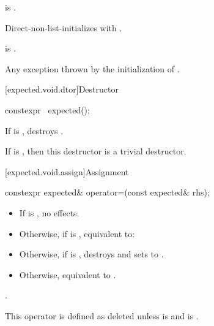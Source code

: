 \begin{itemdescr}
\pnum
\constraints
{} is .

\pnum
\effects
Direct-non-list-initializes 
with .

\pnum
\ensures
{} is .

\pnum
\throws
Any exception thrown by the initialization of .
\end{itemdescr}

[expected.void.dtor]{Destructor}

%
\begin{itemdecl}
constexpr ~expected();
\end{itemdecl}

\begin{itemdescr}
\pnum
\effects
If  is , destroys .

\pnum
\remarks
If  is ,
then this destructor is a trivial destructor.
\end{itemdescr}

[expected.void.assign]{Assignment}

%
\begin{itemdecl}
constexpr expected& operator=(const expected& rhs);
\end{itemdecl}

\begin{itemdescr}
\pnum
\effects
\begin{itemize}
\item
If  is , no effects.
\item
Otherwise, if  is ,
equivalent to: 
\item
Otherwise, if  is ,
destroys  and sets  to .
\item
Otherwise, equivalent to .
\end{itemize}

\pnum
\returns
{}.

\pnum
\remarks
This operator is defined as deleted unless
 is  and
 is .
\end{itemdescr}

